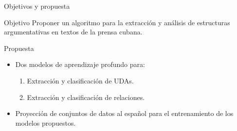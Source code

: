 \documentclass{beamer}
\begin{document}
\begin{frame}{Objetivos y propuesta}
    \begin{block}{Objetivo}
        \pause
        Proponer un algoritmo para la extracción y
        análisis de estructuras argumentativas en textos de la prensa cubana.
    \end{block}
    \pause  
    \begin{block}{Propuesta}
        \pause
        \begin{itemize}
            \item Dos modelos de aprendizaje profundo para:
            \begin{enumerate}
                \pause
                \item Extracción y clasificación de UDAs.
                \pause
                \item Extracción y clasificación de relaciones.
            \end{enumerate}
            \pause
            \item Proyección de conjuntos de datos al español para el entrenamiento de los modelos
            propuestos. 
        \end{itemize}
    \end{block}
\end{frame}
\end{document}
